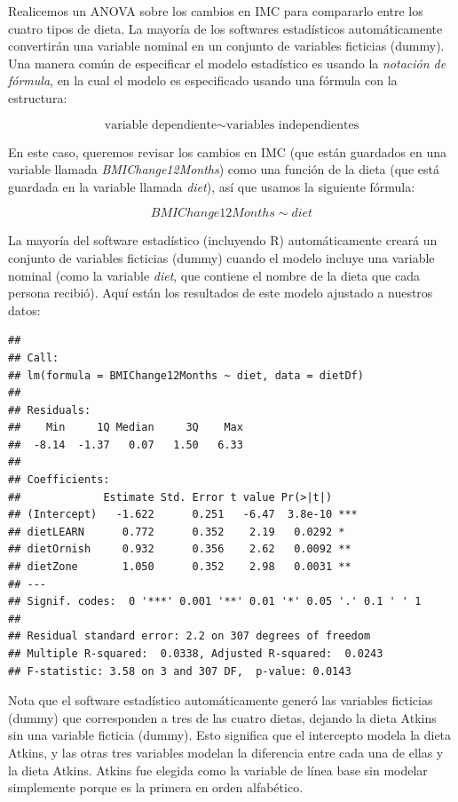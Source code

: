 \documentclass[
  12pt,
]{book}
\theoremstyle{definition}
\theoremstyle{definition}
\theoremstyle{definition}
\theoremstyle{remark}
\begin{document}
Realicemos un ANOVA sobre los cambios en IMC para compararlo entre los cuatro tipos de dieta. La mayoría de los softwares estadísticos automáticamente convertirán una variable nominal en un conjunto de variables ficticias (dummy). Una manera común de especificar el modelo estadístico es usando la \emph{notación de fórmula}, en la cual el modelo es especificado usando una fórmula con la estructura:

\[ 
\text{variable dependiente} \sim \text{variables independientes}
\]

En este caso, queremos revisar los cambios en IMC (que están guardados en una variable llamada \emph{BMIChange12Months}) como una función de la dieta (que está guardada en la variable llamada \emph{diet}), así que usamos la siguiente fórmula:

\[
BMIChange12Months \sim diet
\]

La mayoría del software estadístico (incluyendo R) automáticamente creará un conjunto de variables ficticias (dummy) cuando el modelo incluye una variable nominal (como la variable \emph{diet}, que contiene el nombre de la dieta que cada persona recibió). Aquí están los resultados de este modelo ajustado a nuestros datos:

\begin{verbatim}
## 
## Call:
## lm(formula = BMIChange12Months ~ diet, data = dietDf)
## 
## Residuals:
##    Min     1Q Median     3Q    Max 
##  -8.14  -1.37   0.07   1.50   6.33 
## 
## Coefficients:
##             Estimate Std. Error t value Pr(>|t|)    
## (Intercept)   -1.622      0.251   -6.47  3.8e-10 ***
## dietLEARN      0.772      0.352    2.19   0.0292 *  
## dietOrnish     0.932      0.356    2.62   0.0092 ** 
## dietZone       1.050      0.352    2.98   0.0031 ** 
## ---
## Signif. codes:  0 '***' 0.001 '**' 0.01 '*' 0.05 '.' 0.1 ' ' 1
## 
## Residual standard error: 2.2 on 307 degrees of freedom
## Multiple R-squared:  0.0338,	Adjusted R-squared:  0.0243 
## F-statistic: 3.58 on 3 and 307 DF,  p-value: 0.0143
\end{verbatim}

Nota que el software estadístico automáticamente generó las variables ficticias (dummy) que corresponden a tres de las cuatro dietas, dejando la dieta Atkins sin una variable ficticia (dummy). Esto significa que el intercepto modela la dieta Atkins, y las otras tres variables modelan la diferencia entre cada una de ellas y la dieta Atkins. Atkins fue elegida como la variable de línea base sin modelar simplemente porque es la primera en orden alfabético.
\end{document}
